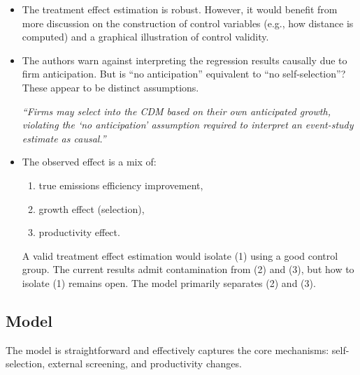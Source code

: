 \documentclass[12pt]{article}[margin=1in]
\begin{document}
\begin{itemize}
    \item The treatment effect estimation is robust. However, it would benefit from more discussion on the construction of control variables (e.g., how distance is computed) and a graphical illustration of control validity.
    \item The authors warn against interpreting the regression results causally due to firm anticipation. But is ``no anticipation'' equivalent to ``no self-selection''? These appear to be distinct assumptions.

          \textit{“Firms may select into the CDM based on their own anticipated growth, violating the ‘no anticipation’ assumption required to interpret an event-study estimate as causal.”}

    \item The observed effect is a mix of:
          \begin{enumerate}
              \item true emissions efficiency improvement,
              \item growth effect (selection),
              \item productivity effect.
          \end{enumerate}
          A valid treatment effect estimation would isolate (1) using a good control group. The current results admit contamination from (2) and (3), but how to isolate (1) remains open. The model primarily separates (2) and (3).
\end{itemize}

\subsection*{Model}

The model is straightforward and effectively captures the core mechanisms: self-selection, external screening, and productivity changes.
\end{document}
